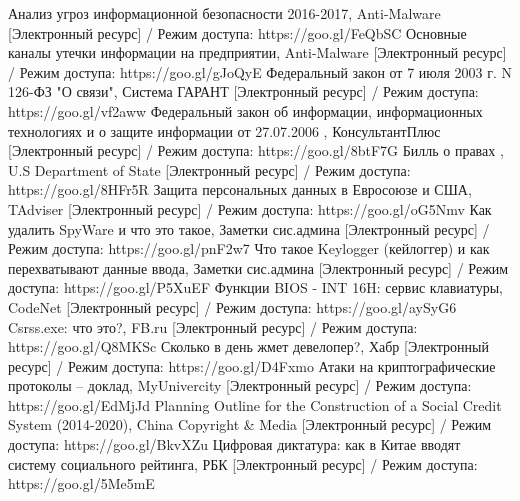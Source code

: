 \begin{thebibliography}{}
	Анализ угроз информационной безопасности 2016-2017, Anti-Malware [Электронный ресурс] / Режим доступа:   https://goo.gl/FeQbSC
	Основные каналы утечки информации на предприятии, Anti-Malware [Электронный ресурс] / Режим доступа:   https://goo.gl/gJoQyE
	Федеральный закон от 7 июля 2003 г. N 126-ФЗ
	"О связи", Система ГАРАНТ [Электронный ресурс] / Режим доступа:   https://goo.gl/vf2aww
	Федеральный закон
	об информации, информационных  технологиях
и о защите информации от 27.07.2006
, КонсультантПлюс [Электронный ресурс] / Режим доступа: https://goo.gl/8btF7G
	Билль о правах
, U.S Department of State  [Электронный ресурс] / Режим доступа: https://goo.gl/8HFr5R
		Защита персональных данных	в Евросоюзе и США, TAdviser  [Электронный ресурс] / Режим доступа: https://goo.gl/oG5Nmv
		Как удалить SpyWare и что это такое, Заметки сис.админа  [Электронный ресурс] / Режим доступа: https://goo.gl/pnF2w7
		Что такое Keylogger (кейлоггер) и как перехватывают данные ввода, Заметки сис.админа  [Электронный ресурс] / Режим доступа: https://goo.gl/P5XuEF
		Функции BIOS - INT 16H: сервис клавиатуры, CodeNet [Электронный ресурс] / Режим доступа: https://goo.gl/aySyG6
	Csrss.exe: что это?, FB.ru [Электронный ресурс] / Режим доступа: https://goo.gl/Q8MKSc
	Сколько в день жмет девелопер?, Хабр [Электронный ресурс] / Режим  доступа: https://goo.gl/D4Fxmo
	Атаки на криптографические протоколы -- доклад, MyUnivercity [Электронный ресурс] / Режим   доступа: https://goo.gl/EdMjJd
	Planning Outline for the Construction of a Social Credit System (2014-2020), China Copyright \& Media [Электронный ресурс] / Режим доступа: https://goo.gl/BkvXZu
	Цифровая диктатура: как в Китае вводят систему социального рейтинга, РБК [Электронный ресурс] / Режим доступа: https://goo.gl/5Me5mE
\end{thebibliography}